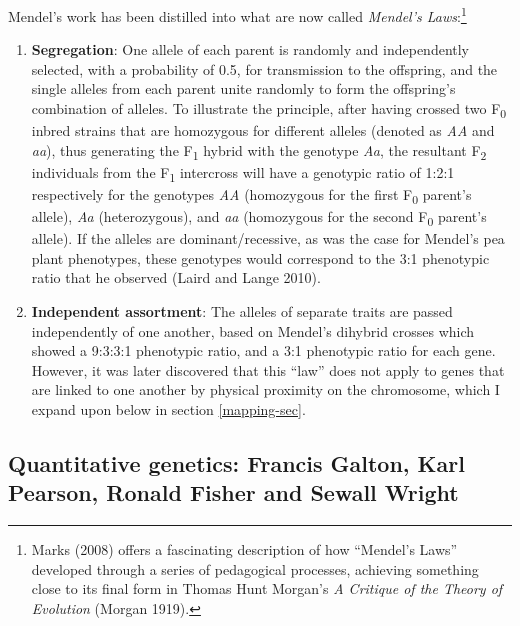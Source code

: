 \documentclass[
]{book}
\begin{document}
Mendel's work has been distilled into what are now called \emph{Mendel's Laws}:\footnote{Marks (2008) offers a fascinating description of how ``Mendel's Laws'' developed through a series of pedagogical processes, achieving something close to its final form in Thomas Hunt Morgan's \emph{A Critique of the Theory of Evolution} (Morgan 1919).}

\begin{enumerate}
\def\labelenumi{\arabic{enumi}.}
\item
  \textbf{Segregation}: One allele of each parent is randomly and independently selected, with a probability of 0.5, for transmission to the offspring, and the single alleles from each parent unite randomly to form the offspring's combination of alleles. To illustrate the principle, after having crossed two F\textsubscript{0} inbred strains that are homozygous for different alleles (denoted as \emph{AA} and \emph{aa}), thus generating the F\textsubscript{1} hybrid with the genotype \emph{Aa}, the resultant F\textsubscript{2} individuals from the F\textsubscript{1} intercross will have a genotypic ratio of 1:2:1 respectively for the genotypes \emph{AA} (homozygous for the first F\textsubscript{0} parent's allele), \emph{Aa} (heterozygous), and \emph{aa} (homozygous for the second F\textsubscript{0} parent's allele). If the alleles are dominant/recessive, as was the case for Mendel's pea plant phenotypes, these genotypes would correspond to the 3:1 phenotypic ratio that he observed (Laird and Lange 2010).
\item
  \textbf{Independent assortment}: The alleles of separate traits are passed independently of one another, based on Mendel's dihybrid crosses which showed a 9:3:3:1 phenotypic ratio, and a 3:1 phenotypic ratio for each gene. However, it was later discovered that this ``law'' does not apply to genes that are linked to one another by physical proximity on the chromosome, which I expand upon below in section \ref{mapping-sec}.
\end{enumerate}

\hypertarget{quant-intro}{%
\subsection{Quantitative genetics: Francis Galton, Karl Pearson, Ronald Fisher and Sewall Wright}\label{quant-intro}}
\end{document}
